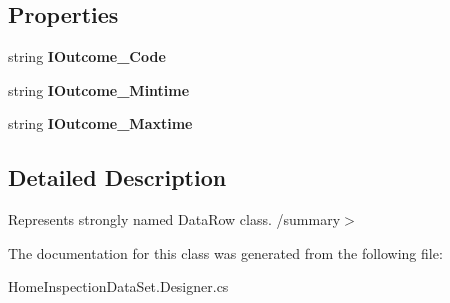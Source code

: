 \subsection*{Properties}
\begin{DoxyCompactItemize}
\item 
\mbox{\label{class_a_f_h___scheduler_1_1_home_inspection_data_set_1_1_inspection___outcome_row_aad6efeb781a0a5308e7592d414575109}} 
string {\bfseries I\+Outcome\+\_\+\+Code}\hspace{0.3cm}{\ttfamily  [get, set]}
\item 
\mbox{\label{class_a_f_h___scheduler_1_1_home_inspection_data_set_1_1_inspection___outcome_row_a09774ec183c4097e05713797029a6227}} 
string {\bfseries I\+Outcome\+\_\+\+Mintime}\hspace{0.3cm}{\ttfamily  [get, set]}
\item 
\mbox{\label{class_a_f_h___scheduler_1_1_home_inspection_data_set_1_1_inspection___outcome_row_aac99d03a5e31d13f2a9127fe9e88af12}} 
string {\bfseries I\+Outcome\+\_\+\+Maxtime}\hspace{0.3cm}{\ttfamily  [get, set]}
\end{DoxyCompactItemize}


\subsection{Detailed Description}
Represents strongly named Data\+Row class. /summary$>$ 

The documentation for this class was generated from the following file\+:\begin{DoxyCompactItemize}
\item 
Home\+Inspection\+Data\+Set.\+Designer.\+cs\end{DoxyCompactItemize}
